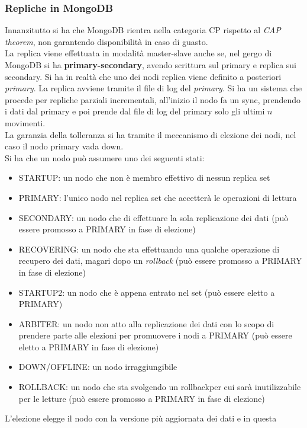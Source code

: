 \documentclass[a4paper,12pt, oneside]{book}
\begin{document}
\subsubsection{Repliche in MongoDB}
Innanzitutto si ha che MongoDB rientra nella categoria CP rispetto al
\textit{CAP theorem}, non garantendo disponibilità in caso di guasto.\\
La replica viene effettuata in modalità master-slave anche se, nel gergo di
MongoDB si ha \textbf{primary-secondary}, avendo scrittura sul primary e replica
sui secondary. Si ha in realtà che uno dei nodi replica viene definito a
posteriori \textit{primary}. La replica avviene tramite il file di log del
\textit{primary}. Si ha un sistema che procede per repliche parziali
incrementali, all'inizio il nodo fa un sync, prendendo i dati dal primary e poi
prende dal file di log del primary solo gli ultimi $n$ movimenti.\\
La garanzia della tolleranza si ha tramite il meccanismo di elezione dei nodi,
nel caso il nodo primary vada down.\\
Si ha che un nodo può assumere uno dei seguenti stati:
\begin{itemize}
  \item STARTUP: un nodo che non è membro effettivo di nessun replica set
  \item PRIMARY: l’unico nodo nel replica set che accetterà le operazioni di
  lettura
  \item SECONDARY: un nodo che di effettuare la sola replicazione dei dati (può
  essere promosso a PRIMARY in fase di elezione)
  \item RECOVERING: un nodo che sta effettuando una qualche operazione di
  recupero dei dati, magari dopo un \textit{rollback} (può essere promosso a
  PRIMARY in fase di elezione) 
  \item STARTUP2: un nodo che è appena entrato nel set (può essere eletto a
  PRIMARY)
  \item ARBITER: un nodo non atto alla replicazione dei dati con lo scopo di
  prendere parte alle elezioni per promuovere i nodi a PRIMARY (può essere
  eletto a PRIMARY in fase di elezione)
  \item DOWN/OFFLINE: un nodo irraggiungibile
  \item ROLLBACK: un nodo che sta svolgendo un rollbackper cui sarà
  inutilizzabile per le letture (può essere promosso a PRIMARY in fase di
  elezione)  
\end{itemize}
L'elezione elegge il nodo con la versione più aggiornata dei dati e in questa
\end{document}
